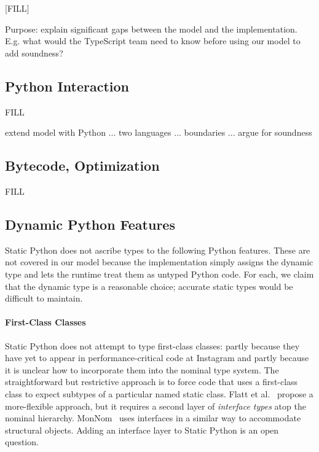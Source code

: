\documentclass[english,cleveref,submission]{programming}
\newcommand{\SP}{Static Python}
\begin{document}
[FILL]

Purpose: explain significant gaps between the model and the implementation.
E.g. what would the TypeScript team need to know before using our model
to add soundness?


\subsection{Python Interaction}

FILL

extend model with Python ... two languages ... boundaries ... argue for soundness


\subsection{Bytecode, Optimization}
\label{s:optimize}

FILL


\subsection{Dynamic Python Features}
\label{s:dynamic-python}

\SP{} does not ascribe types to the following Python features.
These are not covered in our model because the implementation simply
assigns the dynamic type and lets the runtime treat them as untyped
Python code.
For each, we claim that the dynamic type is a reasonable choice;
accurate static types would be difficult to maintain.


\paragraph{First-Class Classes}

\SP{} does not attempt to type first-class classes: partly because they have
yet to appear in performance-critical code at Instagram and partly because it
is unclear how to incorporate them into the nominal type system.
The straightforward but restrictive approach is to force code that uses a
first-class class to expect subtypes of a particular named static class.
Flatt et al.~\cite{fkf-popl-1998} propose a more-flexible approach, %
but it requires a second layer of \emph{interface types} atop the nominal hierarchy.
MonNom~\cite{mt-oopsla-2021} uses interfaces in a similar way to accommodate
structural objects.
Adding an interface layer to \SP{} is an open question.

\end{document}
